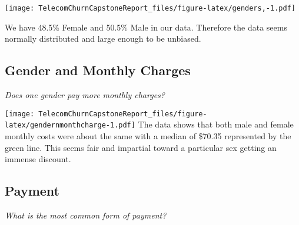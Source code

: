 \documentclass[]{article}
\newenvironment{Shaded}{\begin{snugshade}}{\end{snugshade}}
\newcommand{\KeywordTok}[1]{\textcolor[rgb]{0.13,0.29,0.53}{\textbf{#1}}}
\newcommand{\DataTypeTok}[1]{\textcolor[rgb]{0.13,0.29,0.53}{#1}}
\newcommand{\DecValTok}[1]{\textcolor[rgb]{0.00,0.00,0.81}{#1}}
\newcommand{\StringTok}[1]{\textcolor[rgb]{0.31,0.60,0.02}{#1}}
\newcommand{\OperatorTok}[1]{\textcolor[rgb]{0.81,0.36,0.00}{\textbf{#1}}}
\newcommand{\NormalTok}[1]{#1}
\begin{document}
\texttt{[image: TelecomChurnCapstoneReport\_files/figure-latex/genders,-1.pdf]}

We have 48.5\% Female and 50.5\% Male in our data. Therefore the data
seems normally distributed and large enough to be unbiased.

\subsection{Gender and Monthly
Charges}\label{gender-and-monthly-charges}

\emph{Does one gender pay more monthly charges?}

\begin{Shaded}
\end{Shaded}

\texttt{[image: TelecomChurnCapstoneReport\_files/figure-latex/gendernmonthcharge-1.pdf]}
The data shows that both male and female monthly costs were about the
same with a median of \$70.35 represented by the green line. This seems
fair and impartial toward a particular sex getting an immense discount.

\subsection{Payment}\label{payment}

\emph{What is the most common form of payment?}
\end{document}
